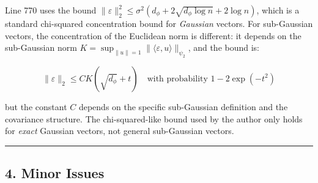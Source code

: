 \documentclass[
  12pt,
]{ctexart}
\begin{document}
Line 770 uses the bound
\(\|\varepsilon\|_2^2 \leq \sigma^2(d_\phi + 2\sqrt{d_\phi \log n} + 2\log n)\),
which is a standard chi-squared concentration bound for \emph{Gaussian}
vectors. For sub-Gaussian vectors, the concentration of the Euclidean
norm is different: it depends on the sub-Gaussian norm
\(K = \sup_{\|u\|=1} \|\langle \varepsilon, u\rangle\|_{\psi_2}\), and
the bound is:

\[\|\varepsilon\|_2 \leq C K (\sqrt{d_\phi} + t) \quad \text{with probability } 1 - 2\exp(-t^2)\]

but the constant \(C\) depends on the specific sub-Gaussian definition
and the covariance structure. The chi-squared-like bound used by the
author only holds for \emph{exact} Gaussian vectors, not general
sub-Gaussian vectors.

\begin{center}\rule{0.5\linewidth}{0.5pt}\end{center}

\subsection{4. Minor Issues}\label{minor-issues}
\end{document}
